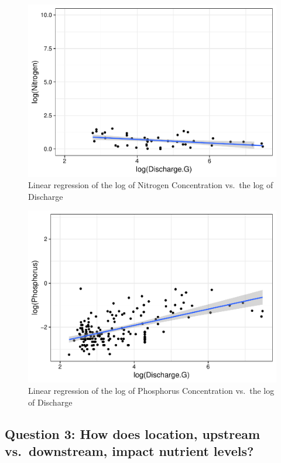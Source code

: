 \documentclass[12pt,]{article}
\begin{document}
\begin{figure}
\centering
\includegraphics{Landman_ENV872_Project_files/figure-latex/Data Analysis Figure 7-1.pdf}
\caption{Linear regression of the log of Nitrogen Concentration vs.~the
log of Discharge}
\end{figure}

\begin{figure}
\centering
\includegraphics{Landman_ENV872_Project_files/figure-latex/Data Analysis Figure 8-1.pdf}
\caption{Linear regression of the log of Phosphorus Concentration
vs.~the log of Discharge}
\end{figure}

\newpage

\hypertarget{question-3-how-does-location-upstream-vs.downstream-impact-nutrient-levels}{%
\subsection{Question 3: How does location, upstream vs.~downstream,
impact nutrient
levels?}\label{question-3-how-does-location-upstream-vs.downstream-impact-nutrient-levels}}
\end{document}
